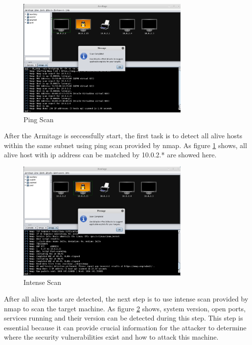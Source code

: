 \documentclass{article}
\begin{document}
\begin{figure}[H]
  \includegraphics[width=8.5cm]{kali2}
  \caption{Ping Scan}
  \label{kali2}
\end{figure}

After the Armitage is seccessfully start, the first task is to detect all alive hosts within the 
same subnet using ping scan provided by nmap. As figure \ref{kali2} shows, all alive host with ip address 
can be matched by 10.0.2.* are showed here.

\begin{figure}[H]
  \includegraphics[width=8.5cm]{kali3}
  \caption{Intense Scan}
  \label{kali3}
\end{figure}

After all alive hosts are detected, the next step is to use intense scan provided by nmap to scan the 
target machine. As figure \ref{kali3} shows, system version, open ports, services running and their version 
can be detected during this step. This step is essential because it can provide crucial information 
for the attacker to determine where the security vulnerabilities exist and how to attack this machine.
\end{document}
